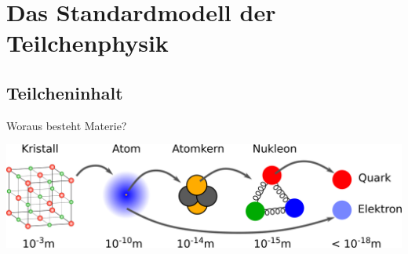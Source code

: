 \documentclass[hyperref={pdfpagelabels=false},ngerman]{beamer}
\begin{document}

\section{Das Standardmodell der Teilchenphysik}

\subsection{Teilcheninhalt}

\begin{frame}{Woraus besteht Materie?}
  \begin{center}
    \includegraphics[width=\textwidth]{images/route}
  \end{center}
\end{frame}
\end{document}
